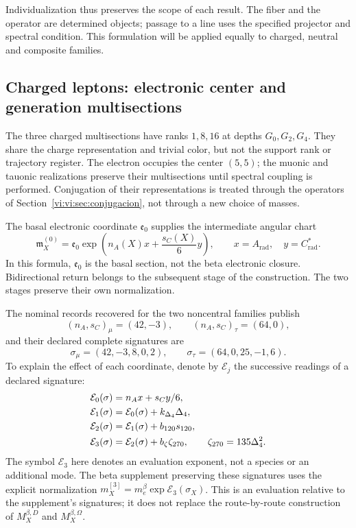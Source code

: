 Individualization thus preserves the scope of each result. The fiber
and the operator are determined objects; passage to a line uses the
specified projector and spectral condition. This formulation will be applied
equally to charged, neutral and composite families.

\subsection{Charged leptons: electronic center and generation multisections}
\label{vi:vi:subsec:leptones-cargados}

The three charged multisections have ranks \(1,8,16\) at depths
\(G_0,G_2,G_4\). They share the charge representation and trivial
color, but not the support rank or trajectory register.
The electron occupies the center \((5,5)\); the muonic and
tauonic realizations preserve their multisections until spectral
coupling is performed. Conjugation of their representations is treated through the
operators of Section~\ref{vi:vi:sec:conjugacion}, not through a new
choice of masses.

The basal electronic coordinate \(\mathfrak e_0\) supplies the intermediate
angular chart
\begin{equation}
 \mathfrak m_X^{(0)}=\mathfrak e_0
 \exp\left(n_A(X)x+\frac{s_C(X)}6y\right),
 \qquad x=A_{\mathrm{rad}},\quad y=C^*_{\mathrm{rad}}.
 \label{vi:vi:eq:carta-angular-familias}
\end{equation}
In this formula, \(\mathfrak e_0\) is the basal section, not the beta
electronic closure. Bidirectional return belongs to the subsequent stage
of the construction. The two stages preserve their own normalization.

The nominal records recovered for the two noncentral families
publish
\[
 (n_A,s_C)_\mu=(42,-3),\qquad (n_A,s_C)_\tau=(64,0),
\]
and their declared complete signatures are
\begin{equation}
 \sigma_\mu=(42,-3,8,0,2),\qquad
 \sigma_\tau=(64,0,25,-1,6).
 \label{vi:vi:eq:firmas-muon-tau}
\end{equation}
To explain the effect of each coordinate, denote by \(\mathcal E_j\)
the successive readings of a declared signature:
\begin{align}
 \mathcal E_0(\sigma)&=n_Ax+s_Cy/6,\notag\\
 \mathcal E_1(\sigma)&=\mathcal E_0(\sigma)+k_{\Delta_4}\Delta_4,\notag\\
 \mathcal E_2(\sigma)&=\mathcal E_1(\sigma)+b_{120}s_{120},\notag\\
 \mathcal E_3(\sigma)&=\mathcal E_2(\sigma)+b_\zeta\zeta_{270},
 \qquad\zeta_{270}=135\Delta_4^2.
 \label{vi:vi:eq:etapas-e3-sectoriales}
\end{align}
The symbol \(\mathcal E_3\) here denotes an evaluation exponent,
not a species or an additional mode. The beta supplement preserving these
signatures uses the explicit normalization
\(m_X^{[3]}=m_e^\beta\exp\mathcal E_3(\sigma_X)\).
This is an evaluation relative to the supplement's signatures; it does not replace
the route-by-route construction of \(M_X^{\beta,D}\) and
\(M_X^{\beta,\Omega}\).

